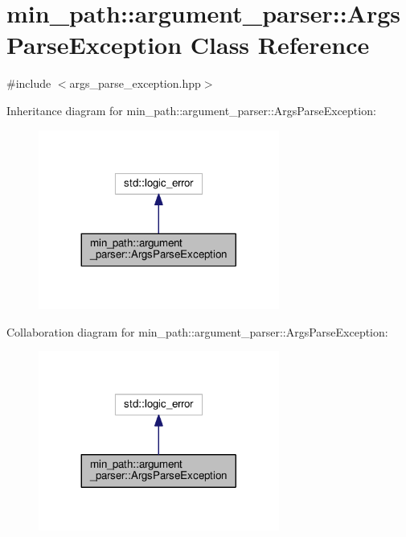 \hypertarget{classmin__path_1_1argument__parser_1_1_args_parse_exception}{}\section{min\+\_\+path\+:\+:argument\+\_\+parser\+:\+:Args\+Parse\+Exception Class Reference}
\label{classmin__path_1_1argument__parser_1_1_args_parse_exception}


{\ttfamily \#include $<$args\+\_\+parse\+\_\+exception.\+hpp$>$}



Inheritance diagram for min\+\_\+path\+:\+:argument\+\_\+parser\+:\+:Args\+Parse\+Exception\+:
\nopagebreak
\begin{figure}[H]
\begin{center}
\leavevmode
\includegraphics[width=224pt]{classmin__path_1_1argument__parser_1_1_args_parse_exception__inherit__graph}
\end{center}
\end{figure}


Collaboration diagram for min\+\_\+path\+:\+:argument\+\_\+parser\+:\+:Args\+Parse\+Exception\+:
\nopagebreak
\begin{figure}[H]
\begin{center}
\leavevmode
\includegraphics[width=224pt]{classmin__path_1_1argument__parser_1_1_args_parse_exception__coll__graph}
\end{center}
\end{figure}
